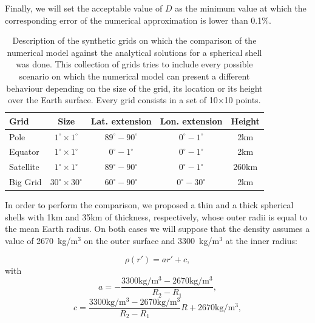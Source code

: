 \documentclass[extra]{gji}
\begin{document}
Finally, we will set the acceptable value of $D$ as the minimum value 
at which the corresponding error of the numerical approximation is 
lower than 0.1\%.

\begin{table}
\caption{
    Description of the synthetic grids on which the comparison of the 
    numerical model against the analytical solutions for a spherical 
    shell was done.
    This collection of grids tries to include every possible scenario 
    on which the numerical model can present a different behaviour 
    depending on the size of the grid, its location or its height over 
    the Earth surface. Every grid consists in a set of 10$\times$10 
    points.
}
\label{tab:grids}
\begin{tabular}{lcccc}
    Grid & Size & Lat. extension & Lon. extension & Height \\ \hline
    Pole & $1^\circ \times 1^\circ$ & $89^\circ - 90^\circ$ &
        $0^\circ - 1^\circ$ & 2km \\
    Equator & $1^\circ \times 1^\circ$ & $0^\circ - 1^\circ$ &
        $0^\circ - 1^\circ$ & 2km \\
    Satellite & $1^\circ \times 1^\circ$ & $89^\circ - 90^\circ$ &
        $0^\circ - 1^\circ$ & 260km \\
    Big Grid & $30^\circ \times 30^\circ$ & $60^\circ - 90^\circ$ &
        $0^\circ - 30^\circ$ & 2km \\
\end{tabular}
\end{table}

In order to perform the comparison, we proposed a thin and a thick 
spherical shells with 1km and 35km of thickness, respectively, whose 
outer radii is equal to the mean Earth radius.
On both cases we will suppose that the density assumes a value of 
2670~kg/m$^3$ on the outer surface and 3300~kg/m$^3$ at the inner 
radius:

\begin{equation}
    \rho(r') = ar' + c,
    \label{eq:density-linear}
\end{equation}
\noindent with 
\begin{equation}
    a = -\frac{3300\text{kg/m$^3$} - 2670\text{kg/m$^3$}}{R_2 - R_1},
\end{equation}
\begin{equation}
    c = \frac{3300\text{kg/m$^3$} - 
        2670\text{kg/m$^3$}}{R_2 - R_1} R + 
        2670\text{kg/m$^3$},
\end{equation}
\end{document}
